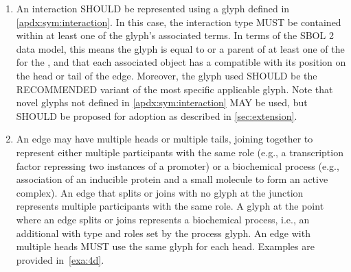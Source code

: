 \begin{enumerate}
\item An interaction SHOULD be represented using a glyph defined in \ref{apdx:sym:interaction}.  In this case, the interaction type MUST be contained within at least one of the glyph's associated terms.
In terms of the SBOL 2 data model, this means the glyph is equal to or a parent of at least one of the  for the , and that each associated  object has a  compatible with its position on the head or tail of the edge.
	Moreover, the glyph used SHOULD be the RECOMMENDED variant of the most specific applicable glyph.  Note that novel glyphs not defined in \ref{apdx:sym:interaction} MAY be used, but SHOULD be proposed for adoption as described in \ref{sec:extension}.

\item An edge may have multiple heads or multiple tails, joining together to represent either multiple participants with the same role (e.g., a transcription factor repressing two instances of a promoter) or a biochemical process (e.g., association of an inducible protein and a small molecule to form an active complex).  An edge that splits or joins with no glyph at the junction represents multiple participants with the same role. A glyph at the point where an edge splits or joins represents a biochemical process, i.e., an additional  with type and roles set by the process glyph. An edge with multiple heads MUST use the same glyph for each head.
Examples are provided in~\ref{exa:4d}.


\end{enumerate}
